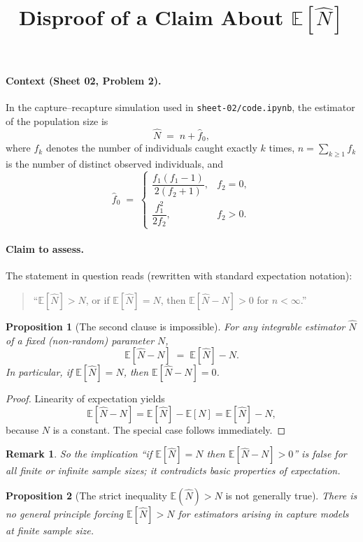 \documentclass[11pt]{article}
\title{Disproof of a Claim About $\mathbb{E}[\hat N]$}
\date{}
\newtheorem{proposition}{Proposition}
\newtheorem{remark}{Remark}
\begin{document}
\maketitle

\paragraph{Context (Sheet 02, Problem 2).}
In the capture--recapture simulation used in \texttt{sheet-02/code.ipynb}, the estimator of the population size is
\[
\hat N \;=\; n + \hat f_0,
\]
where $f_k$ denotes the number of individuals caught exactly $k$ times, $n=\sum_{k\ge 1} f_k$ is the number of distinct observed individuals, and
\[
\hat f_0 \;=\;
\begin{cases}
\dfrac{f_1(f_1-1)}{2(f_2+1)}, & f_2=0,\\[6pt]
\dfrac{f_1^2}{2f_2}, & f_2>0.
\end{cases}
\]

\paragraph{Claim to assess.}
The statement in question reads (rewritten with standard expectation notation):
\begin{quote}
``$\mathbb{E}[\hat N] > N$, or if $\mathbb{E}[\hat N]=N$, then $\mathbb{E}[\hat N-N] > 0$ for $n<\infty$.'' 
\end{quote}

\begin{proposition}[The second clause is impossible]
For any integrable estimator $\hat N$ of a fixed (non-random) parameter $N$,
\[
\mathbb{E}[\hat N-N] \;=\; \mathbb{E}[\hat N] - N.
\]
In particular, if $\mathbb{E}[\hat N]=N$, then $\mathbb{E}[\hat N-N]=0$.
\end{proposition}

\begin{proof}
Linearity of expectation yields
\[
\mathbb{E}[\hat N-N]=\mathbb{E}[\hat N]-\mathbb{E}[N]=\mathbb{E}[\hat N]-N,
\]
because $N$ is a constant. The special case follows immediately.
\end{proof}

\begin{remark}
So the implication ``if $\mathbb{E}[\hat N]=N$ then $\mathbb{E}[\hat N-N]>0$'' is false for all finite or infinite sample sizes; it contradicts basic properties of expectation.
\end{remark}

\begin{proposition}[The strict inequality $\mathbb{E}(\hat N)>N$ is not generally true]
There is no general principle forcing $\mathbb{E}[\hat N]>N$ for estimators arising in capture models at finite sample size.
\end{proposition}
\end{document}
